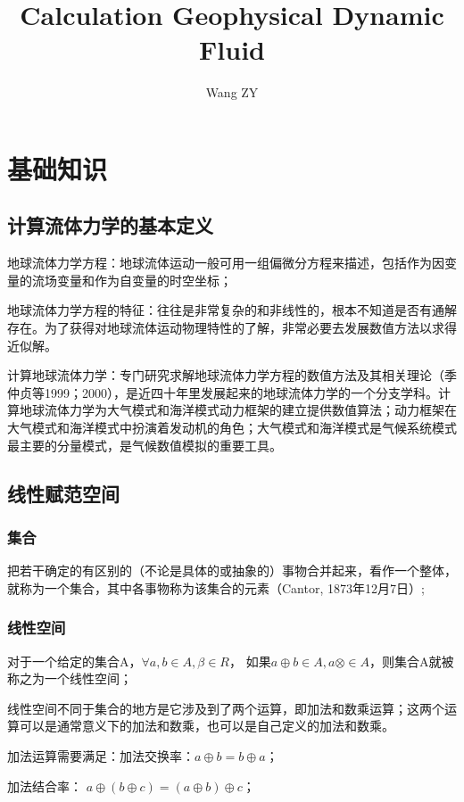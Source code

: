 \documentclass{article}
\title{Calculation Geophysical Dynamic Fluid}
\author{Wang ZY} %
\begin{document}
\maketitle
\tableofcontents
\newpage

\section{基础知识}
\subsection{计算流体力学的基本定义}
地球流体力学方程：地球流体运动一般可用一组偏微分方程来描述，包括作为因变量的流场变量和作为自变量的时空坐标；

地球流体力学方程的特征：往往是非常复杂的和非线性的，根本不知道是否有通解存在。为了获得对地球流体运动物理特性的了解，非常必要去发展数值方法以求得近似解。

计算地球流体力学：专门研究求解地球流体力学方程的数值方法及其相关理论（季仲贞等1999；2000），是近四十年里发展起来的地球流体力学的一个分支学科。计算地球流体力学为大气模式和海洋模式动力框架的建立提供数值算法；动力框架在大气模式和海洋模式中扮演着发动机的角色；大气模式和海洋模式是气候系统模式最主要的分量模式，是气候数值模拟的重要工具。

\subsection{线性赋范空间}
\subsubsection{集合}
把若干确定的有区别的（不论是具体的或抽象的）事物合并起来，看作一个整体，就称为一个集合，其中各事物称为该集合的元素（Cantor, 1873年12月7日）;

\subsubsection{线性空间}
对于一个给定的集合A，$\forall a,b\in A, \beta\in R$， 如果$a\oplus b\in A, a\otimes\in A$，则集合A就被称之为一个线性空间；

线性空间不同于集合的地方是它涉及到了两个运算，即加法和数乘运算；这两个运算可以是通常意义下的加法和数乘，也可以是自己定义的加法和数乘。

加法运算需要满足：加法交换率：$a\oplus b = b \oplus a$；

加法结合率： $a \oplus (b \oplus c) = (a \oplus b) \oplus c $；
\end{document}
